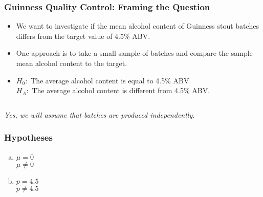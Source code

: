 \documentclass[slidestop,compress,mathserif]{beamer}
\newcommand{\soln}[1]{\textit{#1}}
\begin{document}


\begin{frame}
\frametitle{Guinness Quality Control: Framing the Question}

\begin{itemize}
\item We want to investigate if the mean alcohol content of Guinness stout batches differs from the target value of 4.5\% ABV.
\pause
\item One approach is to take a small sample of batches and compare the sample mean alcohol content to the target.
\pause
\item $H_0:$ The average alcohol content is equal to 4.5\% ABV. \\
$H_A:$ The average alcohol content is different from 4.5\% ABV.
\pause
\end{itemize}

$\:$ \\


\soln{\pause Yes, we will assume that batches are produced independently.}

\end{frame}


\begin{frame}
\frametitle{Hypotheses}


\begin{enumerate}[(a)]
\item  {} $\mu = 0$ \\
 $\mu \ne 0$
\item  {} $p = 4.5$ \\
 $p \ne 4.5$
\end{enumerate}

\end{frame}

\end{document}
